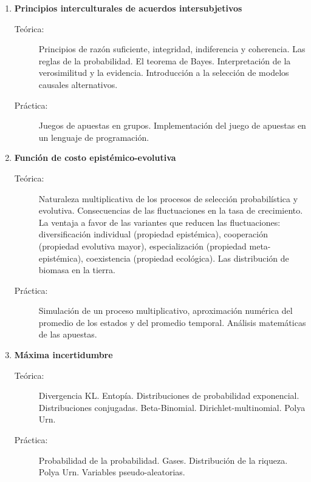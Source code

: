\documentclass[10pt]{article}
\begin{document}
\begin{enumerate}

\item \textbf{Principios interculturales de acuerdos intersubjetivos}
\vspace{-0.15cm}
\begin{description}
\item[Teórica:] Principios de razón suficiente, integridad, indiferencia y coherencia. Las reglas de la probabilidad. El teorema de Bayes. Interpretación de la verosimilitud y la evidencia. Introducción a la selección de modelos causales alternativos.
\item[Práctica:] Juegos de apuestas en grupos. Implementación del juego de apuestas en un lenguaje de programación.
\end{description}

\vspace{0.1cm}
\item \textbf{Función de costo epistémico-evolutiva}
\vspace{-0.15cm}
\begin{description}
\item[Teórica:] Naturaleza multiplicativa de los procesos de selección probabilística y evolutiva. Consecuencias de las fluctuaciones en la tasa de crecimiento. La ventaja a favor de las variantes que reducen las fluctuaciones: diversificación individual (propiedad epistémica), cooperación (propiedad evolutiva mayor), especialización (propiedad meta-epistémica), coexistencia (propiedad ecológica). Las distribución de biomasa en la tierra.
\item[Práctica:] Simulación de un proceso multiplicativo, aproximación numérica del promedio de los estados y del promedio temporal. Análisis matemáticas de las apuestas.
\end{description}


\vspace{0.1cm}
\item \textbf{Máxima incertidumbre}
\vspace{-0.15cm}
\begin{description}
\item[Teórica:] Divergencia KL. Entopía. Distribuciones de probabilidad exponencial. Distribuciones conjugadas. Beta-Binomial. Dirichlet-multinomial. Polya Urn.
\item[Práctica:] Probabilidad de la probabilidad. Gases. Distribución de la riqueza. Polya Urn. Variables pseudo-aleatorias.
\end{description}


\end{enumerate}
\end{document}
